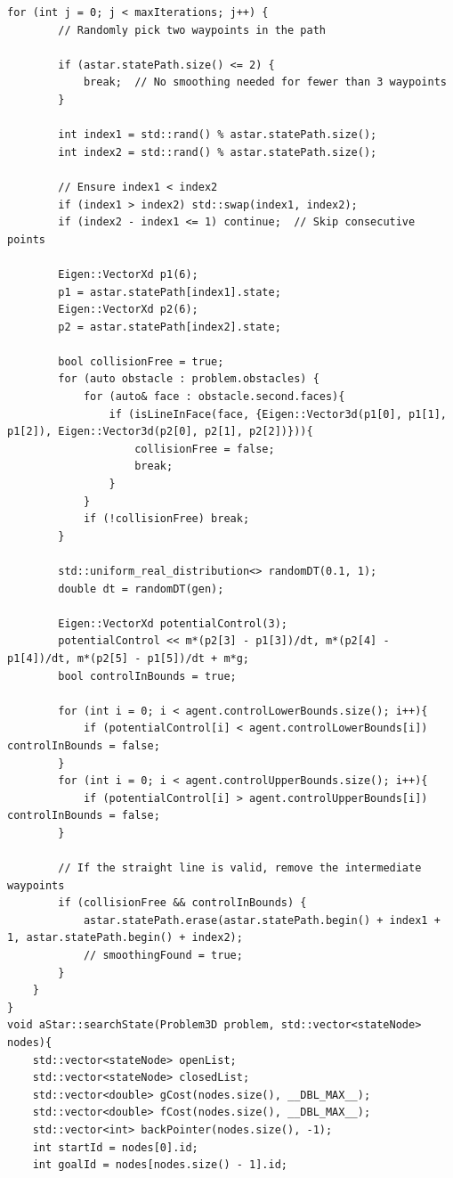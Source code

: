 \documentclass{article}
\begin{document}
\begin{lstlisting}[style=cppstyle]
    for (int j = 0; j < maxIterations; j++) {
        // Randomly pick two waypoints in the path

        if (astar.statePath.size() <= 2) {
            break;  // No smoothing needed for fewer than 3 waypoints
        }

        int index1 = std::rand() % astar.statePath.size();
        int index2 = std::rand() % astar.statePath.size();

        // Ensure index1 < index2
        if (index1 > index2) std::swap(index1, index2);
        if (index2 - index1 <= 1) continue;  // Skip consecutive points

        Eigen::VectorXd p1(6);
        p1 = astar.statePath[index1].state;
        Eigen::VectorXd p2(6);
        p2 = astar.statePath[index2].state;

        bool collisionFree = true;
        for (auto obstacle : problem.obstacles) {
            for (auto& face : obstacle.second.faces){
                if (isLineInFace(face, {Eigen::Vector3d(p1[0], p1[1], p1[2]), Eigen::Vector3d(p2[0], p2[1], p2[2])})){
                    collisionFree = false;
                    break;
                } 
            }
            if (!collisionFree) break;
        }

        std::uniform_real_distribution<> randomDT(0.1, 1);
        double dt = randomDT(gen);

        Eigen::VectorXd potentialControl(3);
        potentialControl << m*(p2[3] - p1[3])/dt, m*(p2[4] - p1[4])/dt, m*(p2[5] - p1[5])/dt + m*g;
        bool controlInBounds = true;

        for (int i = 0; i < agent.controlLowerBounds.size(); i++){
            if (potentialControl[i] < agent.controlLowerBounds[i]) controlInBounds = false;
        }
        for (int i = 0; i < agent.controlUpperBounds.size(); i++){
            if (potentialControl[i] > agent.controlUpperBounds[i]) controlInBounds = false;
        }

        // If the straight line is valid, remove the intermediate waypoints
        if (collisionFree && controlInBounds) {
            astar.statePath.erase(astar.statePath.begin() + index1 + 1, astar.statePath.begin() + index2);
            // smoothingFound = true;
        }
    }
}
void aStar::searchState(Problem3D problem, std::vector<stateNode> nodes){
    std::vector<stateNode> openList;
    std::vector<stateNode> closedList;
    std::vector<double> gCost(nodes.size(), __DBL_MAX__);
    std::vector<double> fCost(nodes.size(), __DBL_MAX__);
    std::vector<int> backPointer(nodes.size(), -1);
    int startId = nodes[0].id;
    int goalId = nodes[nodes.size() - 1].id;


\end{lstlisting}
\end{document}
